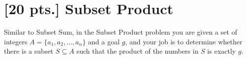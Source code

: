 \documentclass[11pt]{article}
\begin{document}
\label{pg:end-of-p2}
%

\newpage

\section{[20 pts.] Subset Product}

Similar to Subset Sum, in the Subset Product problem you are given a set of 
integers $A = \{a_1, a_2,\ldots, a_n\}$ and a goal $g$, and your job is to 
determine whether there is a subset $S\subseteq A$ such that the product of 
the numbers in $S$ is exactly $g$.
\end{document}

